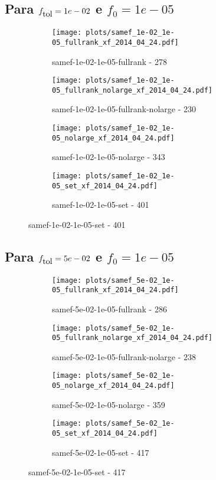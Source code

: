 \newpage
\subsection{Para $f_{\mbox{tol}} = 1e-02$ e $f_0 = 1e-05$}

\begin{figure}[H]
  \centering
  \begin{subfigure}{0.48\textwidth}
    \texttt{[image: plots/samef\_1e-02\_1e-05\_fullrank\_xf\_2014\_04\_24.pdf]}
    \caption{samef-1e-02-1e-05-fullrank - 278}
  \end{subfigure}
  \begin{subfigure}{0.48\textwidth}
    \texttt{[image: plots/samef\_1e-02\_1e-05\_fullrank\_nolarge\_xf\_2014\_04\_24.pdf]}
    \caption{samef-1e-02-1e-05-fullrank-nolarge - 230}
  \end{subfigure}
  \begin{subfigure}{0.48\textwidth}
    \texttt{[image: plots/samef\_1e-02\_1e-05\_nolarge\_xf\_2014\_04\_24.pdf]}
    \caption{samef-1e-02-1e-05-nolarge - 343}
  \end{subfigure}
  \begin{subfigure}{0.48\textwidth}
    \texttt{[image: plots/samef\_1e-02\_1e-05\_set\_xf\_2014\_04\_24.pdf]}
    \caption{samef-1e-02-1e-05-set - 401}
  \end{subfigure}
\end{figure}

\newpage
\subsection{Para $f_{\mbox{tol}} = 5e-02$ e $f_0 = 1e-05$}

\begin{figure}[H]
  \centering
  \begin{subfigure}{0.48\textwidth}
    \texttt{[image: plots/samef\_5e-02\_1e-05\_fullrank\_xf\_2014\_04\_24.pdf]}
    \caption{samef-5e-02-1e-05-fullrank - 286}
  \end{subfigure}
  \begin{subfigure}{0.48\textwidth}
    \texttt{[image: plots/samef\_5e-02\_1e-05\_fullrank\_nolarge\_xf\_2014\_04\_24.pdf]}
    \caption{samef-5e-02-1e-05-fullrank-nolarge - 238}
  \end{subfigure}
  \begin{subfigure}{0.48\textwidth}
    \texttt{[image: plots/samef\_5e-02\_1e-05\_nolarge\_xf\_2014\_04\_24.pdf]}
    \caption{samef-5e-02-1e-05-nolarge - 359}
  \end{subfigure}
  \begin{subfigure}{0.48\textwidth}
    \texttt{[image: plots/samef\_5e-02\_1e-05\_set\_xf\_2014\_04\_24.pdf]}
    \caption{samef-5e-02-1e-05-set - 417}
  \end{subfigure}
\end{figure}

